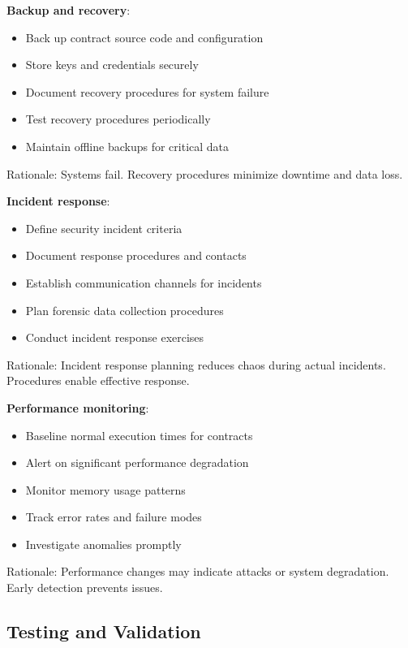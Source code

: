 \textbf{Backup and recovery}:

\begin{itemize}
\item Back up contract source code and configuration
\item Store keys and credentials securely
\item Document recovery procedures for system failure
\item Test recovery procedures periodically
\item Maintain offline backups for critical data
\end{itemize}

Rationale: Systems fail. Recovery procedures minimize downtime and
data loss.

\textbf{Incident response}:

\begin{itemize}
\item Define security incident criteria
\item Document response procedures and contacts
\item Establish communication channels for incidents
\item Plan forensic data collection procedures
\item Conduct incident response exercises
\end{itemize}

Rationale: Incident response planning reduces chaos during actual
incidents. Procedures enable effective response.

\textbf{Performance monitoring}:

\begin{itemize}
\item Baseline normal execution times for contracts
\item Alert on significant performance degradation
\item Monitor memory usage patterns
\item Track error rates and failure modes
\item Investigate anomalies promptly
\end{itemize}

Rationale: Performance changes may indicate attacks or system
degradation. Early detection prevents issues.

\subsection{Testing and Validation}

